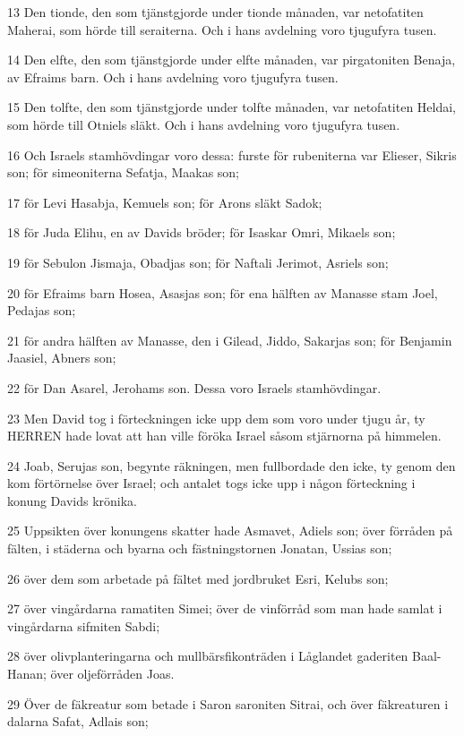 \par 13 Den tionde, den som tjänstgjorde under tionde månaden, var netofatiten Maherai, som hörde till seraiterna. Och i hans avdelning voro tjugufyra tusen.
\par 14 Den elfte, den som tjänstgjorde under elfte månaden, var pirgatoniten Benaja, av Efraims barn. Och i hans avdelning voro tjugufyra tusen.
\par 15 Den tolfte, den som tjänstgjorde under tolfte månaden, var netofatiten Heldai, som hörde till Otniels släkt. Och i hans avdelning voro tjugufyra tusen.
\par 16 Och Israels stamhövdingar voro dessa: furste för rubeniterna var Elieser, Sikris son; för simeoniterna Sefatja, Maakas son;
\par 17 för Levi Hasabja, Kemuels son; för Arons släkt Sadok;
\par 18 för Juda Elihu, en av Davids bröder; för Isaskar Omri, Mikaels son;
\par 19 för Sebulon Jismaja, Obadjas son; för Naftali Jerimot, Asriels son;
\par 20 för Efraims barn Hosea, Asasjas son; för ena hälften av Manasse stam Joel, Pedajas son;
\par 21 för andra hälften av Manasse, den i Gilead, Jiddo, Sakarjas son; för Benjamin Jaasiel, Abners son;
\par 22 för Dan Asarel, Jerohams son. Dessa voro Israels stamhövdingar.
\par 23 Men David tog i förteckningen icke upp dem som voro under tjugu år, ty HERREN hade lovat att han ville föröka Israel såsom stjärnorna på himmelen.
\par 24 Joab, Serujas son, begynte räkningen, men fullbordade den icke, ty genom den kom förtörnelse över Israel; och antalet togs icke upp i någon förteckning i konung Davids krönika.
\par 25 Uppsikten över konungens skatter hade Asmavet, Adiels son; över förråden på fälten, i städerna och byarna och fästningstornen Jonatan, Ussias son;
\par 26 över dem som arbetade på fältet med jordbruket Esri, Kelubs son;
\par 27 över vingårdarna ramatiten Simei; över de vinförråd som man hade samlat i vingårdarna sifmiten Sabdi;
\par 28 över olivplanteringarna och mullbärsfikonträden i Låglandet gaderiten Baal-Hanan; över oljeförråden Joas.
\par 29 Över de fäkreatur som betade i Saron saroniten Sitrai, och över fäkreaturen i dalarna Safat, Adlais son;
